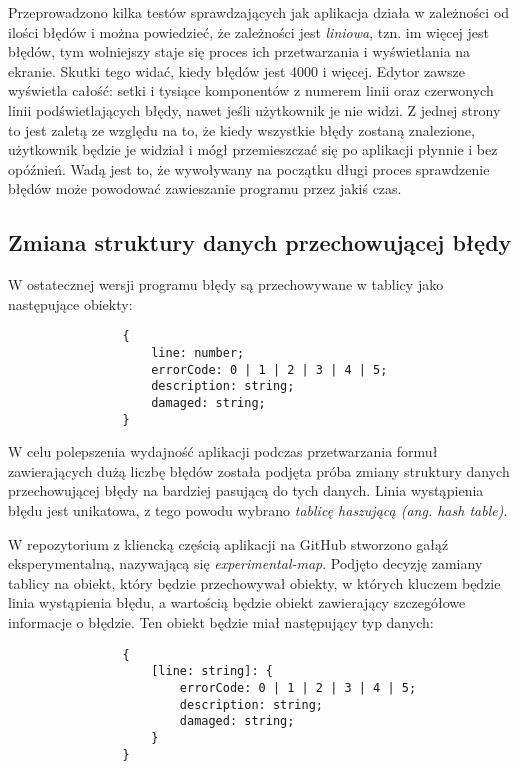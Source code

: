 \documentclass[a4paper,12pt]{book}
\theoremstyle{definition}
\begin{document}
Przeprowadzono kilka testów sprawdzających jak aplikacja działa w zależności od ilości błędów i można powiedzieć, że zależności jest \textit{liniowa}, tzn. im więcej jest błędów, tym wolniejszy staje się proces ich przetwarzania i wyświetlania na ekranie. Skutki tego widać, kiedy błędów jest 4000 i więcej. Edytor zawsze wyświetla całość: setki i tysiące komponentów z numerem linii oraz czerwonych linii podświetlających błędy, nawet jeśli użytkownik je nie widzi. Z jednej strony to jest zaletą ze względu na to, że kiedy wszystkie błędy zostaną znalezione, użytkownik będzie je widział i mógł przemieszczać się po aplikacji płynnie i bez opóźnień. Wadą jest to, że wywoływany na początku długi proces sprawdzenie błędów może powodować zawieszanie programu przez jakiś czas. 

\subsection{Zmiana struktury danych przechowującej błędy}

W ostatecznej wersji programu błędy są przechowywane w tablicy jako następujące obiekty:

\begin{verbatim}
                {
                    line: number;
                    errorCode: 0 | 1 | 2 | 3 | 4 | 5;
                    description: string;
                    damaged: string;
                }
\end{verbatim}

W celu polepszenia wydajność aplikacji podczas przetwarzania formuł zawierających dużą liczbę błędów została podjęta próba zmiany struktury danych przechowującej błędy na bardziej pasującą do tych danych. Linia wystąpienia błędu jest unikatowa, z tego powodu wybrano \textit{tablicę haszującą (ang. hash table)}. 

W repozytorium z kliencką częścią aplikacji na GitHub \cite{github} stworzono gałąź eksperymentalną, nazywającą się \textit{experimental-map}. Podjęto decyzję zamiany tablicy na obiekt, który będzie przechowywał obiekty, w których kluczem będzie linia wystąpienia błędu, a wartością będzie obiekt zawierający szczegółowe informacje o błędzie. Ten obiekt będzie miał następujący typ danych:

\newpage

\begin{verbatim}
                {
                    [line: string]: {
                        errorCode: 0 | 1 | 2 | 3 | 4 | 5;
                        description: string;
                        damaged: string;
                    }
                }
\end{verbatim}
\end{document}
